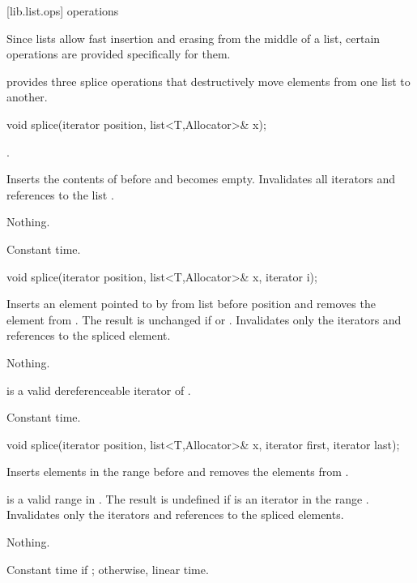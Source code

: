[lib.list.ops]{ operations}

\pnum
Since lists allow fast insertion and erasing from the middle of a list, certain
operations are provided specifically for them.

\pnum
{} provides three splice operations that destructively move elements from one list to
another.

%
\begin{itemdecl}
void splice(iterator position, list<T,Allocator>& x);
\end{itemdecl}

\begin{itemdescr}
\pnum
\requires
{}.

\pnum
\effects
Inserts the contents of
before
and
becomes empty.
Invalidates all iterators and references to the list
.

\pnum
\throws Nothing.

\pnum
\complexity
Constant time.
\end{itemdescr}

%
%
\begin{itemdecl}
void splice(iterator position, list<T,Allocator>& x, iterator i);
\end{itemdecl}

\begin{itemdescr}
\pnum
\effects
Inserts an element pointed to by
from list
before position and removes the element from
.
The result is unchanged if
or
.
Invalidates only the iterators and references to the spliced element.

\pnum
\throws Nothing.

\pnum
\requires
{}
is a valid dereferenceable iterator of
.

\pnum
\complexity
Constant time.
\end{itemdescr}

%
%
\begin{itemdecl}
void splice(iterator position, list<T,Allocator>& x, iterator first,
            iterator last);
\end{itemdecl}

\begin{itemdescr}
\pnum
\effects
Inserts elements in the range
before
and removes the elements from
.

\pnum
\requires
\tcode{[first, last)}
is a valid range in
.
The result is undefined if
is an iterator in the range
.
Invalidates only the iterators and references to the spliced elements.

\pnum
\throws Nothing.

\pnum
\complexity
Constant time if
;
otherwise, linear time.
\end{itemdescr}

